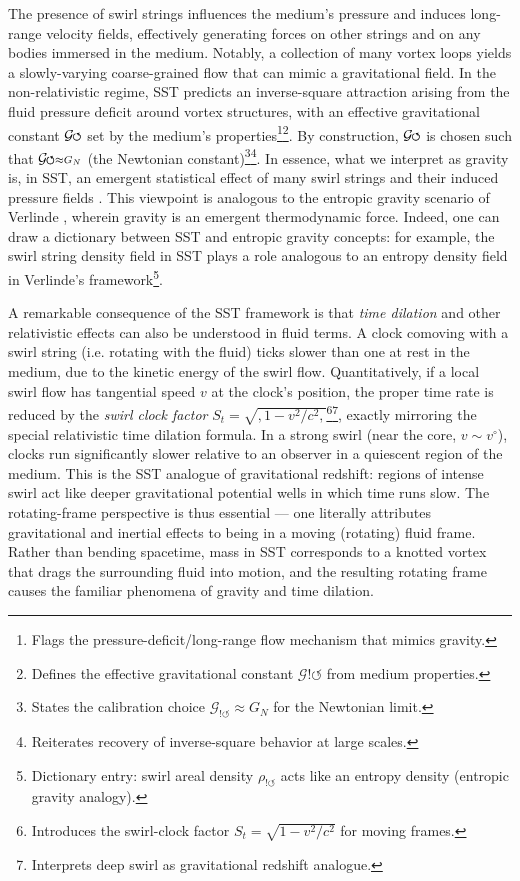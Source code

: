 \documentclass[12pt]{article}
\DeclareRobustCommand{\swirlarrow}{
\mathchoice{\mkern-2mu\scriptstyle\boldsymbol{\circlearrowleft}}%
{\mkern-2mu\scriptstyle\boldsymbol{\circlearrowleft}}%
{\mkern-2mu\scriptscriptstyle\boldsymbol{\circlearrowleft}}%
{\mkern-2mu\scriptscriptstyle\boldsymbol{\circlearrowleft}}
}%
\newcommand{\Gswirl}{\mathcal{G}\swirlarrow}
\begin{document}


The presence of swirl strings influences the medium’s pressure and induces long-range velocity fields, effectively generating forces on other strings and on any bodies immersed in the medium. Notably, a collection of many vortex loops yields a slowly-varying coarse-grained flow that can mimic a gravitational field. In the non-relativistic regime, SST predicts an inverse-square attraction arising from the fluid pressure deficit around vortex structures, with an effective gravitational constant $\Gswirl$ set by the medium’s properties\footnote{Flags the pressure-deficit/long-range flow mechanism that mimics gravity.}\footnote{Defines the effective gravitational constant $\mathcal G{!\circlearrowleft}$ from medium properties.}. By construction, $\Gswirl$ is chosen such that $\Gswirl\approx G_N$ (the Newtonian constant)\footnote{States the calibration choice $\mathcal G_{!\circlearrowleft}\approx G_N$ for the Newtonian limit.}\footnote{Reiterates recovery of inverse-square behavior at large scales.}. In essence, what we interpret as gravity is, in SST, an emergent statistical effect of many swirl strings and their induced pressure fields \cite{Iskandarani2025RotatingFrame}. This viewpoint is analogous to the entropic gravity scenario of Verlinde \cite{Verlinde2011,Verlinde2017}, wherein gravity is an emergent thermodynamic force. Indeed, one can draw a dictionary between SST and entropic gravity concepts: for example, the swirl string density field in SST plays a role analogous to an entropy density field in Verlinde’s framework\footnote{Dictionary entry: swirl areal density $\rho_{!\circlearrowleft}$ acts like an entropy density (entropic gravity analogy).}.


A remarkable consequence of the SST framework is that \emph{time dilation} and other relativistic effects can also be understood in fluid terms. A clock comoving with a swirl string (i.e. rotating with the fluid) ticks slower than one at rest in the medium, due to the kinetic energy of the swirl flow. Quantitatively, if a local swirl flow has tangential speed $v$ at the clock’s position, the proper time rate is reduced by the \emph{swirl clock factor} $S_t = \sqrt{,1 - v^2/c^2,}$\footnote{Introduces the swirl-clock factor $S_t=\sqrt{1-v^2/c^2}$ for moving frames.}\footnote{Interprets deep swirl as gravitational redshift analogue.}, exactly mirroring the special relativistic time dilation formula. In a strong swirl (near the core, $v \sim v^{\circ}$), clocks run significantly slower relative to an observer in a quiescent region of the medium. This is the SST analogue of gravitational redshift: regions of intense swirl act like deeper gravitational potential wells in which time runs slow. The rotating-frame perspective is thus essential --- one literally attributes gravitational and inertial effects to being in a moving (rotating) fluid frame. Rather than bending spacetime, mass in SST corresponds to a knotted vortex that drags the surrounding fluid into motion, and the resulting rotating frame causes the familiar phenomena of gravity and time dilation.
\end{document}
